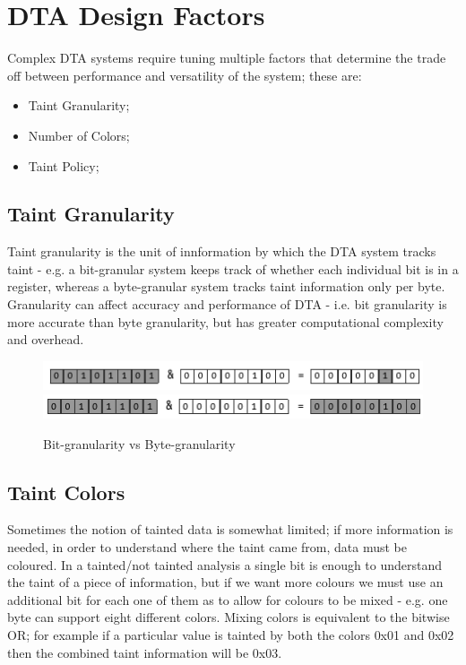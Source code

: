 \section{DTA Design Factors}
Complex DTA systems require tuning multiple factors that determine the trade off between performance and versatility of
the system; these are:
\begin{itemize}
    \item Taint Granularity;
    \item Number of Colors;
    \item Taint Policy;
\end{itemize}


\subsection{Taint Granularity}
Taint granularity is the unit of innformation by which the DTA system tracks taint - e.g. a bit-granular system keeps
track of whether each individual bit is in a register, whereas a byte-granular system tracks taint information only per
byte. Granularity can affect accuracy and performance of DTA - i.e. bit granularity is more accurate than byte
granularity, but has greater computational complexity and overhead.
\begin{figure}[!htbp]
    \begin{center}
        \includegraphics{./pics/bit-granular_taint.png}
        \label{bittaint}
        \includegraphics{./pics/byte-granular_taint.png}
        \label{bytetaint}
        \caption{Bit-granularity vs Byte-granularity}
    \end{center}
\end{figure}


\subsection{Taint Colors}
Sometimes the notion of tainted data is somewhat limited; if more information is needed, in order to understand where
the taint came from, data must be coloured. In a tainted/not tainted analysis a single bit is enough to understand the
taint of a piece of information, but if we want more colours we must use an additional bit for each one of them as to
allow for colours to be mixed - e.g. one byte can support eight different colors. Mixing colors is equivalent to the
bitwise OR; for example if a particular value is tainted by both the colors {\ttfamily 0x01} and {\ttfamily 0x02} then
the combined taint information will be {\ttfamily 0x03}.
